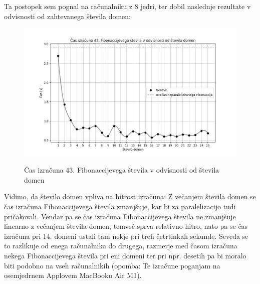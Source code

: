 \documentclass[mat1, tisk]{fmfdelo}
\begin{document}
Ta postopek sem pognal na računalniku z 8 jedri, ter dobil naslednje rezultate v odvisnosti od zahtevanega števila domen:

\begin{figure}[h!]
  \centering
  \caption{Čas izračuna 43. Fibonaccijevega števila v odvisnosti od števila domen}
  \includegraphics[width=13cm]{slike/fib_par_v_odvisnosti_od_domen.jpg}
  \label{fig:paralelizacija-fizikalno}
\end{figure}

Vidimo, da število domen vpliva na hitrost izračuna: Z večanjem števila domen se čas izračuna Fibonaccijevega števila zmanjšuje,
kar bi za paralelizacijo tudi pričakovali. Vendar pa se čas izračuna Fibonaccijevega števila ne zmanjšuje linearno z večanjem števila domen,
temveč sprva relativno hitro, nato pa se čas izračuna pri 14. domeni ustali tam nekje pri treh četrtinkah sekunde.
Seveda se to razlikuje od enega računalnika do drugega, razmerje med časom izračuna nekega Fibonaccijevega števila pri eni domeni ter pri
npr. desetih pa bi moralo biti podobno na vseh računalnikih (opomba: Te izračune poganjam na osemjedrnem Applovem MacBooku Air M1).


\pagebreak
\end{document}

